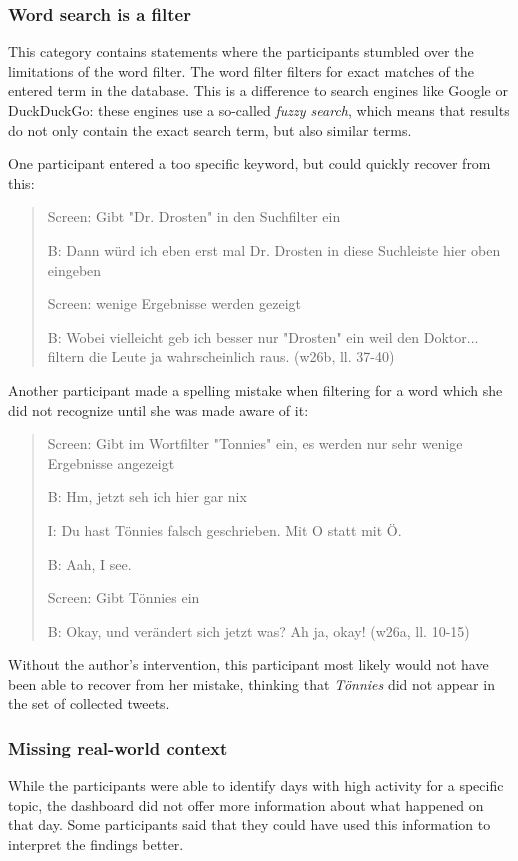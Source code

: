 \subsubsection*{Word search is a filter}
This category contains statements where the participants stumbled over the limitations of the word filter. The word filter filters for exact matches of the entered term in the database. This is a difference to search engines like Google or DuckDuckGo: these engines use a so-called \emph{fuzzy search}, which means that results do not only contain the exact search term, but also similar terms.

One participant entered a too specific keyword, but could quickly recover from this:

\begin{quote}
    Screen: Gibt "Dr. Drosten" in den Suchfilter ein

    B: Dann würd ich eben erst mal Dr. Drosten in diese Suchleiste hier oben eingeben

    Screen: wenige Ergebnisse werden gezeigt

    B: Wobei vielleicht geb ich besser nur "Drosten" ein weil den Doktor... filtern die Leute ja wahrscheinlich raus. (w26b, ll. 37-40)
\end{quote}

Another participant made a spelling mistake when filtering for a word which she did not recognize until she was made aware of it:

\begin{quote}
    Screen: Gibt im Wortfilter "Tonnies" ein, es werden nur sehr wenige Ergebnisse angezeigt

    B: Hm, jetzt seh ich hier gar nix

    I: Du hast Tönnies falsch geschrieben. Mit O statt mit Ö.
    
    B: Aah, I see. 

    Screen: Gibt Tönnies ein

    B: Okay, und verändert sich jetzt was? Ah ja, okay!  (w26a, ll. 10-15)
\end{quote}

Without the author's intervention, this participant most likely would not have been able to recover from her mistake, thinking that \emph{Tönnies} did not appear in the set of collected tweets.

\subsubsection*{Missing real-world context}
While the participants were able to identify days with high activity for a specific topic, the dashboard did not offer more information about what happened on that day. Some participants said that they could have used this information to interpret the findings better.

